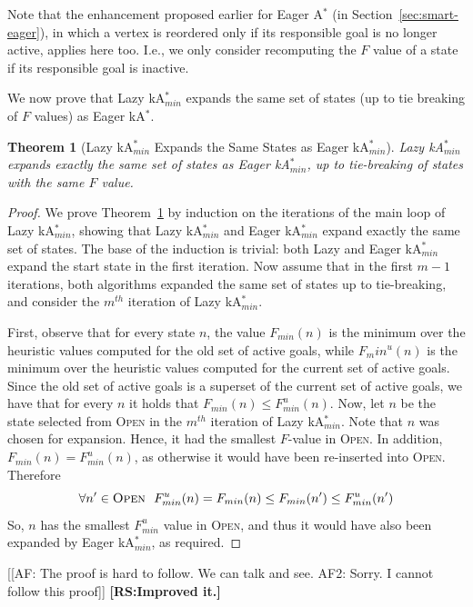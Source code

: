 \documentclass{aicom2e}
\newtheorem{theorem}{Theorem}
\newcommand{\astar}{A$^*$}
\newcommand{\kastar}{kA$^*$}
\newcommand{\kastarmin}{kA$^*_{min}$}
\newcommand{\open}{\textsc{Open}}
\newcommand{\roni}[1]{\textbf{[RS:#1]}}
\begin{document}
Note that the enhancement proposed earlier for Eager \astar{} (in Section~\ref{sec:smart-eager}),
in which a vertex is reordered only if its responsible goal is no longer active, applies here too. I.e., 
we only consider recomputing the $F$ value of a state if its responsible goal is inactive. 



We now prove that Lazy \kastarmin{} expands the same set of states (up to tie breaking of $F$ values) 
as Eager \kastar{}. 
\begin{theorem}[Lazy \kastarmin{} Expands the Same States as Eager \kastarmin{}]
Lazy \kastarmin{} expands exactly the same set of states as Eager \kastarmin{}, up to tie-breaking of states with the same $F$ value.
\label{the:lazy-minf-correct}
\end{theorem}
\begin{proof}
We prove Theorem~\ref{the:lazy-minf-correct} by induction on the iterations
of the main loop of Lazy \kastarmin{}, showing that Lazy \kastarmin{} and Eager \kastarmin{} expand exactly the same set of states.
The base of the induction is trivial: both Lazy and Eager \kastarmin{} expand the start state in the first iteration.
Now assume that in the first $m-1$ iterations, both algorithms expanded the same set of states up to tie-breaking,
and consider the $m^{th}$ iteration of Lazy \kastarmin{}.

First, observe that for every state $n$, the value $F_{min}(n)$ is the minimum over the heuristic values computed for the old set of active goals, while $F_min^u(n)$ is the minimum over the heuristic values computed for the current set of active goals. Since the old set of active goals is a superset of the current set of active goals, we have that for every $n$ it holds that $F_{min}(n)\leq F^u_{min}(n)$. %
Now, let $n$ be the state selected from \open{} in the $m^{th}$ iteration of Lazy \kastarmin{}. 
Note that $n$ was chosen for expansion. Hence, it had the smallest $F$-value in \open{}.
In addition, $F_{min}(n)=F^u_{min}(n)$, as otherwise it
would have been re-inserted into \open{}. 
Therefore
\[ \forall n'\in\open{} ~~ F^u_{min}(n)=F_{min}(n)\leq F_{min}(n') \leq F^u_{min}(n') \]
    So, $n$ has the smallest $F^u_{min}$ value in \open{}, and thus it would have also been expanded by Eager \kastarmin{}, as required.
\end{proof}
[[AF: The proof is hard to follow. We can talk and see. AF2: Sorry. I cannot
follow this proof]]
\roni{Improved it.}
\end{document}
